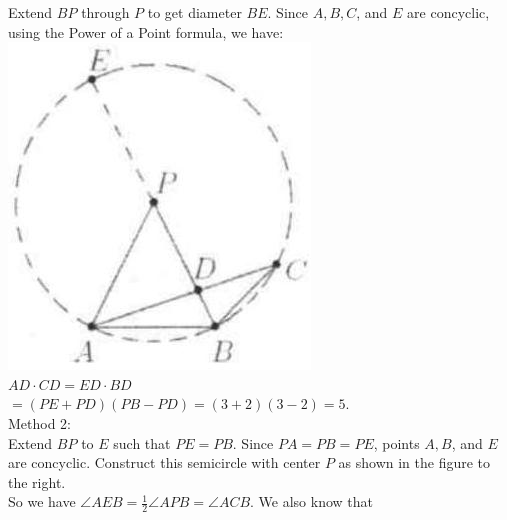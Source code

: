 \documentclass{article}
\begin{document}
Extend \(B P\) through \(P\) to get diameter \(B E\). Since \(A, B, C\), and \(E\) are concyclic, using the Power of a Point formula, we have:\\
\centering
\includegraphics[width=\textwidth]{images/211(1).jpg}\\
\(A D \cdot C D=E D \cdot B D\)\\
\(=(P E+P D)(P B-P D)=(3+2)(3-2)=5\).\\
Method 2:\\
Extend \(B P\) to \(E\) such that \(P E=P B\). Since \(P A=P B=P E\), points \(A, B\), and \(E\) are concyclic. Construct this semicircle with center \(P\) as shown in the figure to the right.\\
So we have \(\angle A E B=\frac{1}{2} \angle A P B=\angle A C B\). We also know that\\
\centering
\end{document}
